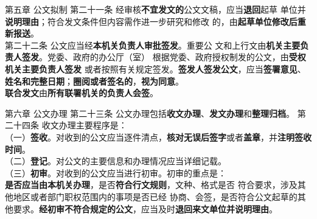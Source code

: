 \documentclass[aspectratio=169]{beamer}
\begin{document}
    \begin{frame}[t]{第五章 公文拟制} \vspace{20pt}
        第二十一条 经审核\textbf{不宜发文的}公文文稿，应当\textbf{退回}起草
        单位并\textbf{说明理由}；符合发文条件但内容需作进一步研究和修改
        的，由\textbf{起草单位修改后重新报送}。\\
        第二十二条 公文应当经\textbf{本机关负责人审批签发}。重要公
        文和上行文由\textbf{机关主要负责人签发}。党委、政府的办公厅（室）
        根据党委、政府授权制发的公文，由\textbf{受权机关主要负责人签发}
        或者按照有关规定签发。\textbf{签发人签发公文}，应当\textbf{签署意见}、
        \textbf{姓名和完整日期}；\textbf{圈阅或者签名的}，\textbf{视为同意}。\\
        \textbf{联合发文}由\textbf{所有联署机关的负责人会签}。\\
    \end{frame}




\begin{frame}[t]{第六章 公文办理} \vspace{20pt}
    第二十三条 公文办理包括\textbf{收文办理}、\textbf{发文办理}和\textbf{整理归档}。
    第二十四条 收文办理主要程序是：\\
    （一）\textbf{签收}。对收到的公文应当逐件清点，\textbf{核对无误后签字}或者\textbf{盖章}，并\textbf{注明签收时间}。\\
    （二）\textbf{登记}。对公文的主要信息和办理情况应当详细记载。\\
    （三）\textbf{初审}。对收到的公文应当进行初审。初审的重点是：\\
    \textbf{是否应当由本机关办理}，是否\textbf{符合行文规则}，文种、格式是否
    符合要求，涉及其他地区或者部门职权范围内的事项是否已经
    协商、会签，是否符合公文起草的其他要求。\textbf{经初审不符合规定的公文}，应当及时\textbf{退回来文单位并说明理由}。\\
\end{frame}
\end{document}
